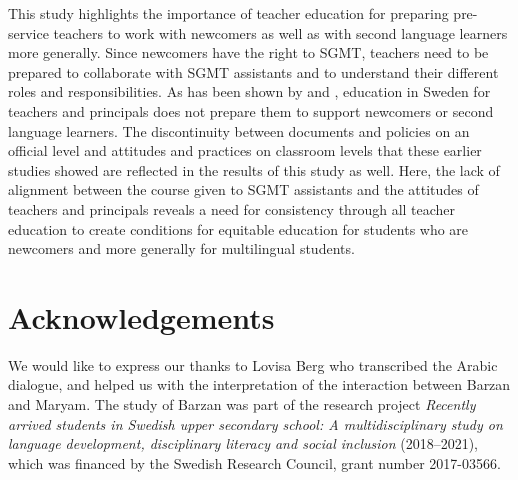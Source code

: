 \documentclass[output=paper]{langscibook}
\begin{document}
This study highlights the importance of teacher education for preparing pre-service teachers to work with newcomers as well as with second language learners more generally. Since newcomers have the right to SGMT, teachers need to be prepared to collaborate with SGMT assistants and to understand their different roles and responsibilities. As has been shown by \citet{Hermansson2022} and \citet{WedinRosen2022}, education in Sweden for teachers and principals does not prepare them to support newcomers or second language learners. The discontinuity between documents and policies on an official level and attitudes and practices on classroom levels that these earlier studies showed are reflected in the results of this study as well. Here, the lack of alignment between the course given to SGMT assistants and the attitudes of teachers and principals reveals a need for consistency through all teacher education to create conditions for equitable education for students who are newcomers and more generally for multilingual students.

\section*{Acknowledgements}

We would like to express our thanks to Lovisa Berg who transcribed the Arabic dialogue, and helped us with the interpretation of the interaction between Barzan and Maryam. The study of Barzan was part of the research project \textit{Recently arrived students in Swedish upper secondary school:  A multidisciplinary   study on language development, disciplinary literacy and social inclusion} (2018--2021), which was financed by the Swedish Research Council, grant number 2017-03566.

\printbibliography[heading=subbibliography,notkeyword=this]
\end{document}
